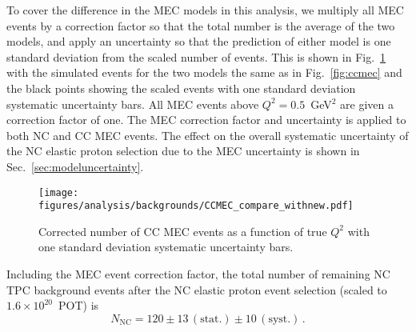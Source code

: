     To cover the difference in the MEC models in this analysis, we multiply all
    MEC events by a correction factor so that the total number is the average
    of the two models, and apply an uncertainty so that the prediction of
    either model is one standard deviation from the scaled number of events.
    This is shown in Fig.~\ref{fig:ccmecscale} with the simulated events for
    the two models the same as in Fig.~\ref{fig:ccmec} and the black points
    showing the scaled events with one standard deviation systematic
    uncertainty bars. All MEC events above $Q^2 = 0.5$~GeV$^2$ are given a
    correction factor of one. The MEC correction factor and uncertainty is
    applied to both NC and CC MEC events. The effect on the overall systematic
    uncertainty of the NC elastic proton selection due to the MEC uncertainty
    is shown in Sec.~\ref{sec:modeluncertainty}.
    \begin{figure}[ht]
      \centering
      \texttt{[image: figures/analysis/backgrounds/CCMEC\_compare\_withnew.pdf]}
      \caption{Corrected number of CC MEC events as a function of true $Q^2$ with
      one standard deviation systematic uncertainty bars.}
      \label{fig:ccmecscale}
    \end{figure}
    Including the MEC event correction factor, the total number
    of remaining NC TPC background events after the NC elastic proton event
    selection (scaled to $1.6\times 10^{20}$~POT) is 
    \begin{equation}
      N_{\textrm{NC}} = 120 \pm 13\, (\textrm{stat.}) \pm 10\, (\textrm{syst.}) \,.
    \end{equation}

